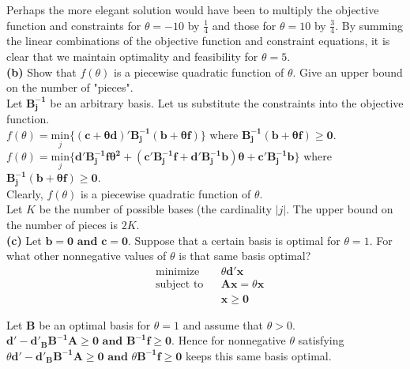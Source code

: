 \documentclass{article}
\begin{document}
\noindent 
Perhaps the more elegant solution would have been to multiply the objective function and constraints for $\theta = -10$ by $\frac{1}{4}$ and those for $\theta = 10$ by $\frac{3}{4}$.  By summing the linear combinations of the objective function and constraint equations, it is clear that we maintain optimality and feasibility for $\theta = 5$.  \\

\noindent
\textbf{(b)}  Show that $f(\theta)$ is a piecewise quadratic function of $\theta$.  Give an upper bound on the number of "pieces". \\

\noindent
Let $\mathbf{B_j^{-1}}$ be an arbitrary basis.  Let us substitute the constraints into the objective function. \\
$f(\theta) = \underset{j}{\text{min}} \{ \mathbf{(c+ \theta d)' B_j^{-1}(b + \theta f)}\}$ where $\mathbf{B_j^{-1} (b + \theta f) \geq 0}$. \\
$f(\theta) = \underset{j}{\text{min}} \{ \mathbf{ d' B_j^{-1} f \theta^2 + (c'B_j^{-1} f + d'B_j^{-1} b)\theta  + c' B_j^{-1} b }\} $ where $\mathbf{B_j^{-1} (b + \theta f) \geq 0}$. \\
Clearly, $f(\theta)$ is a piecewise quadratic function of $\theta$.  \\

\noindent
Let $K$ be the number of possible bases (the cardinality $|j|$.  The upper bound on the number of pieces is $2K$.\\

\noindent
\textbf{(c)}  Let $\mathbf{b = 0 \text{ and } c = 0}$.  Suppose that a certain basis is optimal for $\theta = 1$.  For what other nonnegative values of $\theta$ is that same basis optimal? \\

\noindent
\begin{equation*}
\begin{aligned}
& \text{minimize} && \theta\mathbf{d'x} \\
& \text{subject to} && \mathbf{Ax = } \theta \mathbf{x} \\
& && \mathbf{x \geq 0}
\end{aligned}
\end{equation*}

\noindent
Let $\mathbf{B}$ be an optimal basis for $\theta = 1$ and assume that $\theta > 0$.  $\mathbf{d' - d'_B B^{-1} A \geq 0 \text{ and } B^{-1}f \geq 0}$.  Hence for nonnegative $\theta$ satisfying $\theta \mathbf{d' - d'_B B^{-1} A \geq 0 \text{ and } } \theta \mathbf{B^{-1}f \geq 0}$ keeps this same basis optimal. \\
\end{document}
